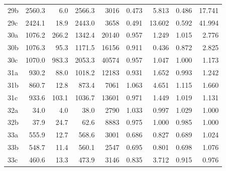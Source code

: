 \begin{center}
\begin{longtable}{@{}l@{\hspace{6pt}}rrrr@{\hspace{8pt}}rrrr@{}}
29b & 2560.3 & 6.0 & 2566.3 & 3016 & 0.473 & 5.813 & 0.486 & 17.741 \\
29c & 2424.1 & 18.9 & 2443.0 & 3658 & 0.491 & 13.602 & 0.592 & 41.994 \\
30a & 1076.2 & 266.2 & 1342.4 & 20140 & 0.957 & 1.249 & 1.015 & 2.776 \\
30b & 1076.3 & 95.3 & 1171.5 & 16156 & 0.911 & 0.436 & 0.872 & 2.825 \\
30c & 1070.0 & 983.3 & 2053.3 & 40574 & 0.957 & 1.047 & 1.000 & 1.173 \\
31a & 930.2 & 88.0 & 1018.2 & 12183 & 0.931 & 1.652 & 0.993 & 1.242 \\
31b & 860.7 & 12.8 & 873.4 & 7061 & 1.063 & 4.651 & 1.115 & 1.660 \\
31c & 933.6 & 103.1 & 1036.7 & 13601 & 0.971 & 1.449 & 1.019 & 1.131 \\
32a & 34.0 & 4.0 & 38.0 & 2790 & 1.033 & 0.997 & 1.029 & 1.000 \\
32b & 37.9 & 24.7 & 62.6 & 8883 & 0.975 & 1.000 & 0.985 & 1.000 \\
33a & 555.9 & 12.7 & 568.6 & 3001 & 0.686 & 0.827 & 0.689 & 1.024 \\
33b & 548.7 & 11.4 & 560.1 & 2547 & 0.695 & 0.801 & 0.698 & 1.076 \\
33c & 460.6 & 13.3 & 473.9 & 3146 & 0.835 & 3.712 & 0.915 & 0.976 \\
\end{longtable}
\end{center}

